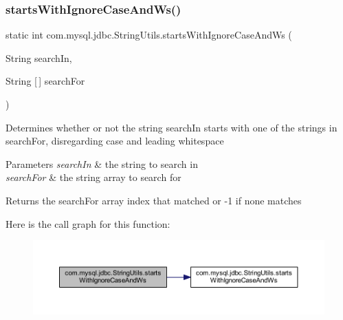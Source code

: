 \subsubsection{\texorpdfstring{starts\+With\+Ignore\+Case\+And\+Ws()}{startsWithIgnoreCaseAndWs()}\hspace{0.1cm}{\footnotesize\ttfamily [3/3]}}
{\footnotesize\ttfamily static int com.\+mysql.\+jdbc.\+String\+Utils.\+starts\+With\+Ignore\+Case\+And\+Ws (\begin{DoxyParamCaption}\item[{String}]{search\+In,  }\item[{String \mbox{[}$\,$\mbox{]}}]{search\+For }\end{DoxyParamCaption})\hspace{0.3cm}{\ttfamily [static]}}

Determines whether or not the string \textquotesingle{}search\+In\textquotesingle{} starts with one of the strings in \textquotesingle{}search\+For\textquotesingle{}, disregarding case and leading whitespace


\begin{DoxyParams}{Parameters}
{\em search\+In} & the string to search in \\
\hline
{\em search\+For} & the string array to search for\\
\hline
\end{DoxyParams}
\begin{DoxyReturn}{Returns}
the \textquotesingle{}search\+For\textquotesingle{} array index that matched or -\/1 if none matches 
\end{DoxyReturn}
Here is the call graph for this function\+:
\nopagebreak
\begin{figure}[H]
\begin{center}
\leavevmode
\includegraphics[width=350pt]{classcom_1_1mysql_1_1jdbc_1_1_string_utils_aa21253db094aee0f6574a06c1076158c_cgraph}
\end{center}
\end{figure}
\mbox{\label{classcom_1_1mysql_1_1jdbc_1_1_string_utils_ad636754b7611d6235efff200a958779c}} 
